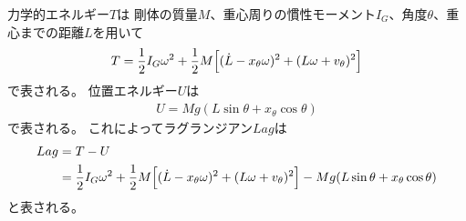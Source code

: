 \documentclass[a4paper,11pt]{jsarticle}
\begin{document}
力学的エネルギー$T$は
剛体の質量$M$、重心周りの慣性モーメント$I_G$、角度$\theta$、重心までの距離$L$を用いて
\begin{align}
  T = 
  \frac{1}{2}I_G\omega^2
  + \frac{1}{2}M
  \Bigl[ (\dot{L} - x_\theta \omega)^2 + (L\omega + v_\theta)^2 \Bigr]
\end{align}
で表される。
位置エネルギー$U$は
\begin{align}
  U = Mg ( L\sin\theta + x_\theta \cos\theta )
\end{align}
で表される。
これによってラグランジアン$Lag$は
\begin{align}
  Lag &=
  T - U
  \\
  &= 
  \frac{1}{2}I_G\omega^2
  + \frac{1}{2}M
  \Bigl[ (\dot{L} - x_\theta \omega)^2 + (L\omega + v_\theta)^2 \Bigr]
  - Mg ( L\sin\theta + x_\theta \cos\theta )
\end{align}
と表される。
\end{document}
